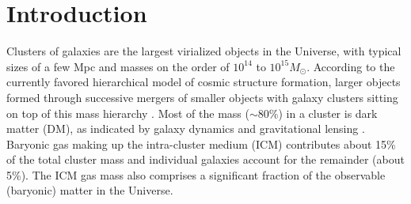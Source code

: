 \documentclass[12pt,manuscript]{aastex}
\begin{document}
%
%


%
%

\section{Introduction}
Clusters of galaxies are the largest virialized objects in the Universe, with typical sizes of a
few Mpc and masses on the order of $10^{14}$ to $10^{15} M_{\odot}$. According to the currently
favored hierarchical model of cosmic structure formation, larger objects formed through successive
mergers of smaller objects with galaxy clusters sitting on top of this mass hierarchy
\citep[see][for a review]{article:Voit:2005}. Most of the mass ($\sim$80\%) in a cluster is dark
matter (DM), as indicated by galaxy dynamics and gravitational lensing
\citep{article:DiaferioSchindlerDolag:2008}. Baryonic gas making up the intra-cluster medium (ICM)
contributes about 15\% of the total cluster mass and individual galaxies account for the remainder
(about 5\%). The ICM gas mass also comprises a significant fraction of the observable (baryonic)
matter in the Universe.
\end{document}
